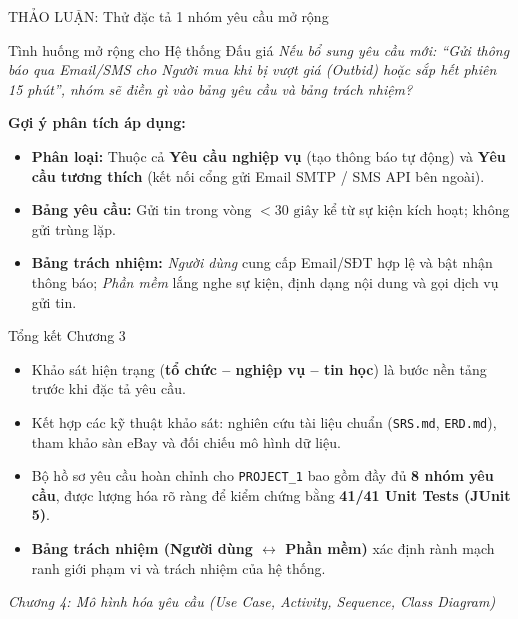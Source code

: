 \documentclass[aspectratio=169, 10pt]{beamer}
\begin{document}
\begin{frame}{THẢO LUẬN: Thử đặc tả 1 nhóm yêu cầu mở rộng}
    \begin{block}{Tình huống mở rộng cho Hệ thống Đấu giá}
        \textit{Nếu bổ sung yêu cầu mới: ``Gửi thông báo qua Email/SMS cho Người mua khi bị vượt giá (Outbid) hoặc sắp hết phiên 15 phút'', nhóm sẽ điền gì vào bảng yêu cầu và bảng trách nhiệm?}
    \end{block}
    \vspace{0.3cm}
    \textbf{Gợi ý phân tích áp dụng:}
    \begin{itemize}
        \item \textbf{Phân loại:} Thuộc cả \textbf{Yêu cầu nghiệp vụ} (tạo thông báo tự động) và \textbf{Yêu cầu tương thích} (kết nối cổng gửi Email SMTP / SMS API bên ngoài).
        \item \textbf{Bảng yêu cầu:} Gửi tin trong vòng $< 30\text{ giây}$ kể từ sự kiện kích hoạt; không gửi trùng lặp.
        \item \textbf{Bảng trách nhiệm:} \textit{Người dùng} cung cấp Email/SĐT hợp lệ và bật nhận thông báo; \textit{Phần mềm} lắng nghe sự kiện, định dạng nội dung và gọi dịch vụ gửi tin.
    \end{itemize}
\end{frame}

\begin{frame}{Tổng kết Chương 3}
    \begin{itemize}
        \item Khảo sát hiện trạng (\textbf{tổ chức -- nghiệp vụ -- tin học}) là bước nền tảng trước khi đặc tả yêu cầu.
        \item Kết hợp các kỹ thuật khảo sát: nghiên cứu tài liệu chuẩn (\texttt{SRS.md}, \texttt{ERD.md}), tham khảo sàn eBay và đối chiếu mô hình dữ liệu.
        \item Bộ hồ sơ yêu cầu hoàn chỉnh cho \texttt{PROJECT\_1} bao gồm đầy đủ \textbf{8 nhóm yêu cầu}, được lượng hóa rõ ràng để kiểm chứng bằng \textbf{41/41 Unit Tests (JUnit 5)}.
        \item \textbf{Bảng trách nhiệm (Người dùng $\leftrightarrow$ Phần mềm)} xác định rành mạch ranh giới phạm vi và trách nhiệm của hệ thống.
    \end{itemize}
    \vspace{0.3cm}
    \begin{center}
        \textit{\color{secondarySlate}Chương 4: Mô hình hóa yêu cầu (Use Case, Activity, Sequence, Class Diagram)}
    \end{center}
\end{frame}
\end{document}
